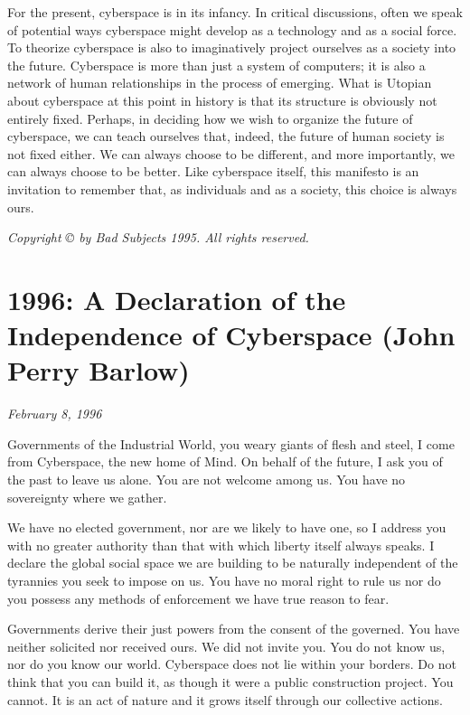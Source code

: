 \documentclass[letterpaper,12pt,english]{sphinxmanual}
\begin{document}
For the present, cyberspace is in its infancy. In critical discussions, often we speak of potential ways cyberspace might develop as a technology and as a social force. To theorize cyberspace is also to imaginatively project ourselves as a society into the future. Cyberspace is more than just a system of computers; it is also a network of human relationships in the process of emerging. What is Utopian about cyberspace at this point in history is that its structure is obviously not entirely fixed. Perhaps, in deciding how we wish to organize the future of cyberspace, we can teach ourselves that, indeed, the future of human society is not fixed either. We can always choose to be different, and more importantly, we can always choose to be better. Like cyberspace itself, this manifesto is an invitation to remember that, as individuals and as a society, this choice is always ours.

\emph{Copyright © by Bad Subjects 1995. All rights reserved.}


\chapter{1996: A Declaration of the Independence of Cyberspace (John Perry Barlow)}
\label{1996::doc}\label{1996:a-declaration-of-the-independence-of-cyberspace-john-perry-barlow}
\emph{February 8, 1996}

Governments of the Industrial World, you weary giants of flesh and steel, I come from Cyberspace, the new home of Mind. On behalf of the future, I ask you of the past to leave us alone. You are not welcome among us. You have no sovereignty where we gather.

We have no elected government, nor are we likely to have one, so I address you with no greater authority than that with which liberty itself always speaks. I declare the global social space we are building to be naturally independent of the tyrannies you seek to impose on us. You have no moral right to rule us nor do you possess any methods of enforcement we have true reason to fear.

Governments derive their just powers from the consent of the governed. You have neither solicited nor received ours. We did not invite you. You do not know us, nor do you know our world. Cyberspace does not lie within your borders. Do not think that you can build it, as though it were a public construction project. You cannot. It is an act of nature and it grows itself through our collective actions.
\end{document}
